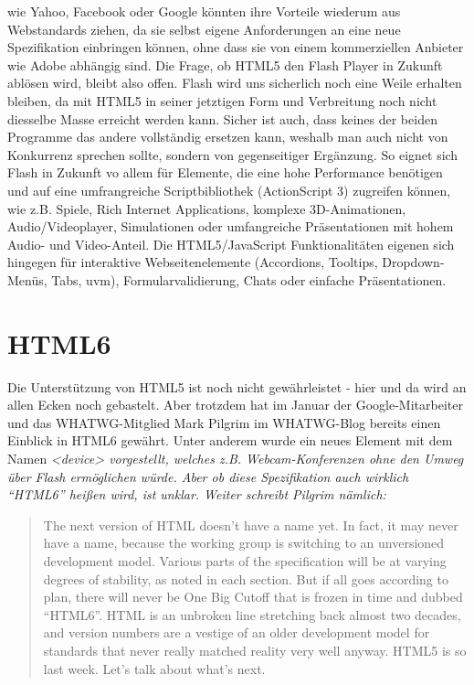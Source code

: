 wie Yahoo, Facebook oder Google könnten ihre Vorteile wiederum
aus Webstandards ziehen, da sie selbst eigene Anforderungen an eine
neue Spezifikation einbringen können, ohne dass sie von einem 
kommerziellen Anbieter wie Adobe abhängig sind.
\newline\newline
Die Frage, ob HTML5 den Flash Player in Zukunft ablösen wird, bleibt also offen.
Flash wird uns sicherlich noch eine Weile erhalten bleiben, da mit HTML5
in seiner jetztigen Form und Verbreitung noch nicht diesselbe Masse
erreicht werden kann. Sicher ist auch, dass keines der beiden Programme
das andere vollständig ersetzen kann, weshalb man auch nicht von
Konkurrenz sprechen sollte, sondern von gegenseitiger Ergänzung.
\newline\newline
So eignet sich Flash in Zukunft vo allem für Elemente, die eine hohe Performance
benötigen und auf eine umfrangreiche Scriptbibliothek (ActionScript 3)
zugreifen können, wie z.B. Spiele, Rich Internet Applications, komplexe
3D-Animationen, Audio/Videoplayer, Simulationen oder umfangreiche
Präsentationen mit hohem Audio- und Video-Anteil. Die HTML5/JavaScript
Funktionalitäten eigenen sich hingegen für interaktive Webseitenelemente
(Accordions, Tooltips, Dropdown-Menüs, Tabs, uvm), Formularvalidierung,
Chats oder einfache Präsentationen.

\section{HTML6}

Die Unterstützung von HTML5 ist noch nicht gewährleistet - hier und da wird
an allen Ecken noch gebastelt. Aber trotzdem hat im Januar der 
Google-Mitarbeiter und das WHATWG-Mitglied Mark Pilgrim im WHATWG-Blog
bereits einen Einblick in HTML6 gewährt. Unter anderem wurde ein neues
Element mit dem Namen \em{<device>} vorgestellt, welches z.B.
Webcam-Konferenzen ohne den Umweg über Flash ermöglichen würde.
Aber ob diese Spezifikation auch wirklich "`HTML6"' heißen wird, ist unklar.
Weiter schreibt Pilgrim nämlich:

\begin{quote}
	The next version of HTML doesn't have a name yet. In fact,
	it may never have a name, because the working group is
	switching to an unversioned development model. Various
	parts of the specification will be at varying degrees of 
	stability, as noted in each section. But if all goes according 
	to plan, there will never be One Big Cutoff that is frozen in
	time and dubbed "`HTML6"'. HTML is an unbroken line
	stretching back almost two decades, and version numbers
	are a vestige of an older development model for standards
	that never really matched reality very well anyway.
	HTML5 is so last week. Let's talk about what's next.
\end{quote}


